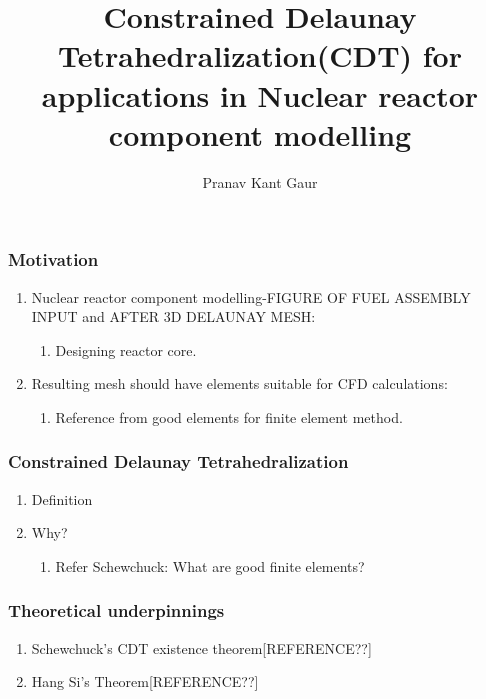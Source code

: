 \documentclass{beamer}
\title[CDT]{Constrained Delaunay Tetrahedralization(CDT) for applications in Nuclear reactor component modelling}
\author{Pranav Kant Gaur}
\institute[BARC, Mumbai]{Computer Division, \newline Bhabha Atomic Research Centre, Mumbai, India}
\date{}
\begin{document}
	\begin{frame}
		\titlepage
	\end{frame}	
	\begin{frame}
	\frametitle{Motivation}
		\begin{enumerate}
			\item Nuclear reactor component modelling-FIGURE OF FUEL ASSEMBLY INPUT and AFTER 3D DELAUNAY MESH:
				\begin{enumerate}
					\item Designing reactor core.	
				\end{enumerate}		
			\item Resulting mesh should have elements suitable for CFD calculations:
				\begin{enumerate}
					\item Reference from good elements for finite element method.	
				\end{enumerate}		
		\end{enumerate}		
	\end{frame}
	\begin{frame}
		\frametitle{Constrained Delaunay Tetrahedralization}
			\begin{enumerate}
				\item Definition		
				\item Why?
					\begin{enumerate}
						\item Refer Schewchuck: What are good finite elements?		
					\end{enumerate}		
			\end{enumerate}		
	\end{frame}	
	\begin{frame}
		\frametitle{Theoretical underpinnings}
			\begin{enumerate}
				\item	Schewchuck's CDT existence theorem[REFERENCE??]
				\item	Hang Si's Theorem[REFERENCE??]
			\end{enumerate}		
	\end{frame}	
\end{document}
